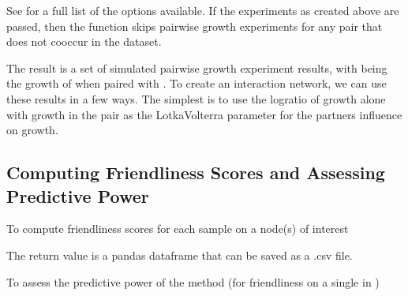 \documentclass[letterpaper,10pt,english]{sphinxmanual}
\begin{document}
\sphinxAtStartPar
See {\hyperref[\detokenize{network_build:make_gem_network.get_pairwise_growth}]{}} for a full list of the options available. If the experiments as created above
are passed, then the function skips pairwise growth experiments for any pair that does not co\sphinxhyphen{}occur in the dataset.

\sphinxAtStartPar
The result is a set of simulated pairwise growth experiment results, with  being the growth of  when paired with . To create an interaction network, we can use these results in a few ways.
The simplest is to use the log\sphinxhyphen{}ratio of growth alone with growth in the pair as the Lotka\sphinxhyphen{}Volterra parameter for the partners influence on growth.


\subsection{Computing Friendliness Scores and Assessing Predictive Power}
\label{\detokenize{usage:computing-friendliness-scores-and-assessing-predictive-power}}
\sphinxAtStartPar
To compute friendliness scores for each sample on a node(s) of interest

\begin{sphinxVerbatim}[commandchars=\\\{\}]
   

  
   
    \PYG{p}{[}\PYG{p}{]}  
\end{sphinxVerbatim}

\sphinxAtStartPar
The return value is a pandas dataframe that can be saved as a .csv file.

\sphinxAtStartPar
To assess the predictive power of the method (for friendliness on a single  in )

\begin{sphinxVerbatim}[commandchars=\\\{\}]
   

  
\end{sphinxVerbatim}
\end{document}
